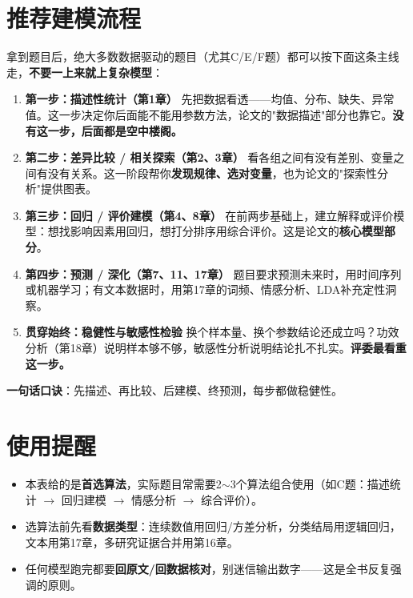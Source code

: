 \section{推荐建模流程}

拿到题目后，绝大多数数据驱动的题目（尤其C/E/F题）都可以按下面这条主线走，\textbf{不要一上来就上复杂模型}：

\begin{enumerate}
    \item \textbf{第一步：描述性统计（第1章）}
    先把数据看透——均值、分布、缺失、异常值。这一步决定你后面能不能用参数方法，论文的"数据描述"部分也靠它。\textbf{没有这一步，后面都是空中楼阁。}

    \item \textbf{第二步：差异比较 / 相关探索（第2、3章）}
    看各组之间有没有差别、变量之间有没有关系。这一阶段帮你\textbf{发现规律、选对变量}，也为论文的"探索性分析"提供图表。

    \item \textbf{第三步：回归 / 评价建模（第4、8章）}
    在前两步基础上，建立解释或评价模型：想找影响因素用回归，想打分排序用综合评价。这是论文的\textbf{核心模型部分}。

    \item \textbf{第四步：预测 / 深化（第7、11、17章）}
    题目要求预测未来时，用时间序列或机器学习；有文本数据时，用第17章的词频、情感分析、LDA补充定性洞察。

    \item \textbf{贯穿始终：稳健性与敏感性检验}
    换个样本量、换个参数结论还成立吗？功效分析（第18章）说明样本够不够，敏感性分析说明结论扎不扎实。\textbf{评委最看重这一步。}
\end{enumerate}

\textbf{一句话口诀}：先描述、再比较、后建模、终预测，每步都做稳健性。

\section{使用提醒}

\begin{itemize}
    \item 本表给的是\textbf{首选算法}，实际题目常需要2$\sim$3个算法组合使用（如C题：描述统计 $\rightarrow$ 回归建模 $\rightarrow$ 情感分析 $\rightarrow$ 综合评价）。
    \item 选算法前先看\textbf{数据类型}：连续数值用回归/方差分析，分类结局用逻辑回归，文本用第17章，多研究证据合并用第16章。
    \item 任何模型跑完都要\textbf{回原文/回数据核对}，别迷信输出数字——这是全书反复强调的原则。
\end{itemize}
